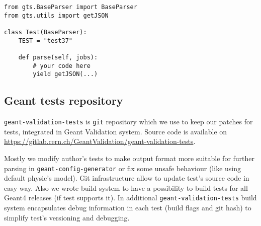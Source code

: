 \begin{verbatim}
from gts.BaseParser import BaseParser
from gts.utils import getJSON

class Test(BaseParser):
    TEST = "test37"

    def parse(self, jobs):
        # your code here
        yield getJSON(...)
\end{verbatim}


\subsection{Geant tests repository}
\label{sec-geant-validation-tests}

{\tt geant-validation-tests} is {\tt git} repository which we use to keep our patches for tests, integrated in Geant Validation system. Source code is available on \url{https://gitlab.cern.ch/GeantValidation/geant-validation-tests}.

Mostly we modify author's tests to make output format more suitable for further parsing in {\tt geant-config-generator} or fix some unsafe behaviour (like using  default physic's model). Git infrastructure allow to update test's source code in easy way. Also we wrote build system to have a possibility to build tests for all Geant4 releases (if test supports it). In additional {\tt geant-validation-tests} build system encapsulates debug information in each test (build flags and git hash) to simplify test's versioning and debugging.
